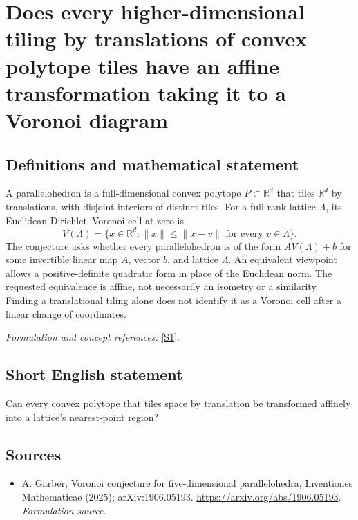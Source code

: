 \documentclass[11pt]{article}
\begin{document}
\section*{\texorpdfstring{Does every higher-dimensional tiling by translations of convex polytope tiles have an affine transformation taking it to a Voronoi diagram}{Does every higher-dimensional tiling by translations of convex polytope tiles have an affine transformation taking it to a Voronoi diagram}}\label{7200079}
\subsection{Definitions and mathematical statement}
A parallelohedron is a full-dimensional convex polytope $P\subset{\mathbb{R}}^d$ that tiles ${\mathbb{R}}^d$ by translations, with disjoint interiors of distinct tiles. For a full-rank lattice $\Lambda$, its Euclidean Dirichlet--Voronoi cell at zero is
\[
 V(\Lambda)=\{x\in{\mathbb{R}}^d:\|x\|\le\|x-v\|
                 \text{ for every }v\in\Lambda\}.
\]
The conjecture asks whether every parallelohedron is of the form $A V(\Lambda)+b$ for some invertible linear map $A$, vector $b$, and lattice $\Lambda$. An equivalent viewpoint allows a positive-definite quadratic form in place of the Euclidean norm. The requested equivalence is affine, not necessarily an isometry or a similarity. Finding a translational tiling alone does not identify it as a Voronoi cell after a linear change of coordinates.
\par\smallskip\textit{Formulation and concept references:} \href{https://arxiv.org/abs/1906.05193}{[S1]}.

\subsection{Short English statement}
Can every convex polytope that tiles space by translation be transformed affinely into a lattice's nearest-point region?
\subsection{Sources}
\begin{itemize}
\item[S1]A. Garber, Voronoi conjecture for five-dimensional parallelohedra, Inventiones Mathematicae (2025); arXiv:1906.05193.
\url{https://arxiv.org/abs/1906.05193}.
\textit{Formulation source.}
\end{itemize}
\end{document}
